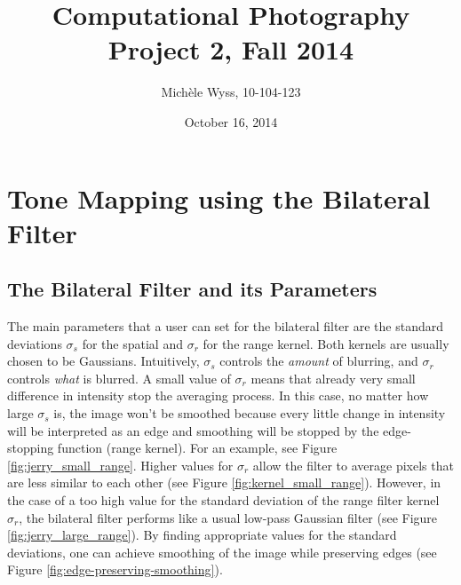 \documentclass[a4spaper]{article}
\title{Computational Photography \\ Project 2, Fall 2014}
\author{Mich\`ele Wyss, 10-104-123}
\date{October 16, 2014}
\begin{document}
\maketitle
\section{Tone Mapping using the Bilateral Filter}
\subsection*{The Bilateral Filter and its Parameters}
The main parameters that a user can set for the bilateral filter are the standard deviations $\sigma_s$ for the spatial and $\sigma_r$ for the range kernel. 
Both kernels are usually chosen to be Gaussians. 
Intuitively, $\sigma_s$ controls the {\em amount} of blurring, and $\sigma_r$ controls {\em what} is blurred. 
A small value of $\sigma_r$ means that already very small difference in intensity stop the averaging process. 
In this case, no matter how large $\sigma_s$ is, the image won't be smoothed because every little change in intensity will be interpreted as an edge and smoothing will be stopped by the edge-stopping function (range kernel). 
For an example, see Figure \ref{fig:jerry_small_range}. 
Higher values for $\sigma_r$ allow the filter to average pixels that are less similar to each other (see Figure \ref{fig:kernel_small_range}). 
However, in the case of a too high value for the standard deviation of the range filter kernel $\sigma_r$, the bilateral filter performs like a usual low-pass Gaussian filter (see Figure \ref{fig:jerry_large_range}). 
By finding appropriate values for the standard deviations, one can achieve smoothing of the image while preserving edges (see Figure \ref{fig:edge-preserving-smoothing}).
\end{document}
